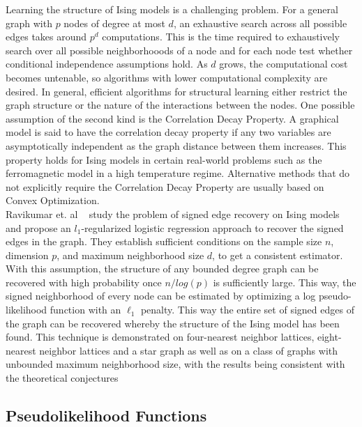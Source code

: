 \documentclass[11pt]{article}
\begin{document}
Learning the structure of Ising models is a challenging problem. 
For a general graph with $p$ nodes of degree at most $ d $, an exhaustive search across all possible edges takes around $ p^d $ computations. 
This is the time required to exhaustively search over all possible neighborhooods of a node and for each node test whether conditional independence assumptions hold. 
As $ d $ grows, the computational cost becomes untenable, so algorithms with lower computational complexity are desired.
In general, efficient algorithms for structural learning either restrict the graph structure or the nature of the interactions between the nodes. 
One possible assumption of the second kind is the Correlation Decay Property. 
A graphical model is said to have the correlation decay property if any two variables are asymptotically independent as the graph distance between them increases. 
This property holds for Ising models in certain real-world problems such as the ferromagnetic model in a high temperature regime. 
Alternative methods that do not explicitly require the Correlation Decay Property are usually based on Convex Optimization. \\

Ravikumar et. al ~\cite{ravikumar2010high} study the problem of signed edge recovery on Ising models and propose an $l_1$-regularized logistic regression approach to recover the signed edges in the graph.
They establish sufficient conditions on the sample size $n$, dimension $p$, and maximum neighborhood size $d$, to get a consistent estimator.
With this assumption, the structure of any bounded degree graph can be recovered with high probability once $n/log(p)$ is sufficiently large. 
This way, the signed neighborhood of every node can be estimated by optimizing a log pseudo-likelihood function with an $\ell_1$ penalty.
This way the entire set of signed edges of the graph can be recovered whereby the structure of the Ising model has been found.
This technique is demonstrated on four-nearest neighbor lattices, eight-nearest neighbor lattices and a star graph as well as on a class of graphs with unbounded maximum neighborhood size, with the results being consistent with the theoretical conjectures


\subsection{Pseudolikelihood Functions}
\end{document}
